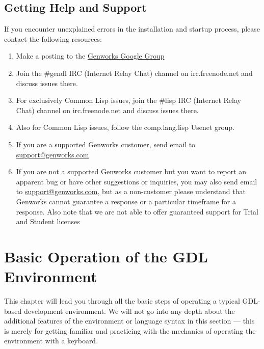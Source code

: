 \documentclass [11pt]{book}
\begin{document}
\section{Getting Help and Support}

\label{sec:gettinghelpandsupport}

If you encounter unexplained errors in the installation and
startup process, please contact the following resources:

\begin{enumerate}

\item Make a posting to the \href{http://groups.google.com/group/genworks}{Genworks Google Group}

\item Join the \#gendl IRC (Internet Relay Chat) channel on
	irc.freenode.net and discuss issues there.

\item For exclusively Common Lisp issues, join the \#lisp
	IRC (Internet Relay Chat) channel on irc.freenode.net and
	discuss issues there.

\item Also for Common Lisp issues, follow the comp.lang.lisp
	Usenet group.

\item If you are a supported Genworks customer, send email to \href{mailto:support@genworks.com}{support@genworks.com}

\item If you are not a supported Genworks customer but you want to report an apparent bug or have other suggestions or inquiries, you may also send email to \href{mailto:support@genworks.com}{support@genworks.com}, but as a non-customer please understand that Genworks
	  cannot guarantee a response or a particular timeframe for a
	  response. Also note that we are not able to offer guaranteed
	  support for Trial and Student licenses 

\end{enumerate}



\chapter{Basic Operation of the GDL Environment}

\label{chap:basicoperationofthegdlenvironment}

This chapter will lead you through all the basic steps of
operating a typical GDL-based development environment. We will not go
into any depth about the additional features of the environment or
language syntax in this section --- this is merely for getting
familiar and practicing with the mechanics of operating the
environment with a keyboard.
\end{document}
